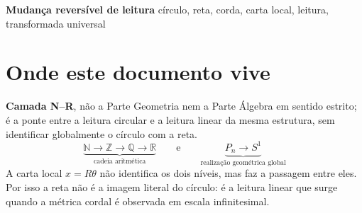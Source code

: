 \documentclass[11pt,a4paper]{article}
\begin{document}
\newcommand{\code}[1]{\texttt{\small #1}}
\newcommand{\sepcol}{\quad\penalty0$\big|$\quad\penalty0}
\newcommand{\medido}[1]{\par\medskip\noindent{\small\color{cinza}\textbf{Medido.} #1}\par\medskip}


       {\textbf{Mudança reversível de leitura}}
       {círculo, reta, corda, carta local, leitura, transformada universal}
\maketitle

\begin{abstract}
O objeto aqui construído não é uma nova aritmética: é uma ponte entre duas leituras da mesma estrutura discreta. A família de polígonos regulares aproxima a circunferência em sentido geométrico apropriado; a cadeia
\[
\mathbb N\subset\mathbb Z\subset\mathbb Q\subset\mathbb R
\]
produz o contínuo linear por contagem, orientação, densidade e completamento. A ligação entre as duas é a carta local
\[
 x=R\theta,
\]
porque a distância cordal
\[
\ell(\theta_1,\theta_2)=2R\sin\left(\frac{|\theta_1-\theta_2|}{2}\right)
\]
lineariza-se localmente:
\[
\ell(\theta_1,\theta_2)=R|\theta_1-\theta_2|+O(|\theta_1-\theta_2|^3).
\]
O erro a evitar é simples: não se conclui que $P_n\to\mathbb R$. O que se conclui é mais rigoroso: a família $P_n$ realiza geometricamente o círculo; a cadeia $\mathbb Q\to\mathbb R$ produz o contínuo linear; e a carta local compatibiliza as duas escalas sem afirmar que o círculo seja a reta. A transformada universal não inventa a reta; ela organiza uma mudança reversível de leitura entre o suporte circular, a métrica cordal e a coordenada linear local. A métrica não gera probabilidade: ela lê concordância da estrutura. A distribuição só aparece depois da multiplicidade e da normalização.
\end{abstract}

\section*{Onde este documento vive}

\noindent\textbf{Camada N--R}, não a Parte Geometria nem a Parte Álgebra em sentido estrito; é a ponte entre a leitura circular e a leitura linear da mesma estrutura, sem identificar globalmente o círculo com a reta.
\[
\boxed{\;
\underbrace{\mathbb N\to\mathbb Z\to\mathbb Q\to\mathbb R}_{\text{cadeia aritmética}}
\qquad\text{e}\qquad
\underbrace{P_n\to S^1}_{\text{realização geométrica global}}\;}
\]
A carta local $x=R\theta$ não identifica os dois níveis, mas faz a passagem entre eles. Por isso a reta não é a imagem literal do círculo: é a leitura linear que surge quando a métrica cordal é observada em escala infinitesimal.
\end{document}
